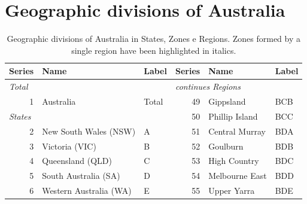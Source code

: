 \documentclass[a4paper,11pt]{article}
\theoremstyle{definition}
\begin{document}
\section{Geographic divisions of Australia}
\label{app:australia}
\begin{table}[H]
	\caption{Geographic divisions of Australia in States, Zones e Regions. Zones formed by a single region have been highlighted in italics.}
	\label{tab:australia}
	\fontsize{9}{10}\selectfont
	\centering
	\begin{tabular}{r l l|r l l}
		\toprule
		\textbf{Series}                      & \textbf{Name}           & \textbf{Label} & \textbf{Series}                                 & \textbf{Name}                   & \textbf{Label} \\
		\midrule
		\multicolumn{1}{l}{\textit{Total}}   &                         &                & \multicolumn{3}{l|}{\textit{continues Regions}}                                                    \\
		1                                    & Australia               & Total          & 49                                              & Gippsland                       & BCB            \\
		\cline{1-3}
		\multicolumn{1}{l}{\textit{States}}  &                         &                & 50                                              & Phillip Island                  & BCC            \\
		2                                    & New South Wales (NSW)   & A              & 51                                              & Central Murray                  & BDA            \\
		3                                    & Victoria (VIC)          & B              & 52                                              & Goulburn                        & BDB            \\
		4                                    & Queensland (QLD)        & C              & 53                                              & High Country                    & BDC            \\
		5                                    & South Australia (SA)    & D              & 54                                              & Melbourne East                  & BDD            \\
		6                                    & Western Australia (WA)  & E              & 55                                              & Upper Yarra                     & BDE            \\

\end{tabular}
\end{table}
\end{document}
